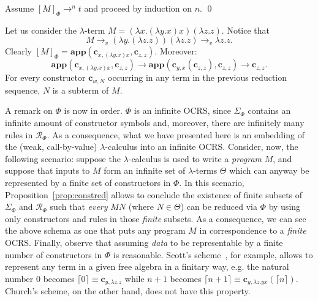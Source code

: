 \documentclass{LMCS}
\newcommand{\varone}{x}
\newcommand{\vartwo}{y}
\newcommand{\varthree}{z}
\newcommand{\varfour}{w}
\newcommand{\lambdaone}{M}
\newcommand{\lambdatwo}{N}
\newcommand{\termone}{t}
\newcommand{\nat}[1]{\lceil #1\rceil}
\newcommand{\appTRS}{\mathbf{app}}
\newcommand{\constr}[2]{\mathbf{c}_{#1,#2}}
\newcommand{\LambdatoTRS}[1]{[#1]_{\Phi}}
\newcommand{\Functions}[1]{\Sigma_{#1}}
\newcommand{\Rules}[1]{\mathcal{R}_{#1}}
\newcommand{\TRS}{\Phi}
\newcommand{\rewrTRS}{\rightarrow}
\newcommand{\rewrlambdav}{\rightarrow_v}
\newcounter{number}
\begin{document}
\proof
Assume $\LambdatoTRS{\lambdaone}\rewrTRS^n\termone$ and proceed
by induction on $n$.
\qed
\begin{exa}
Let us consider the $\lambda$-term $\lambdaone=(\lambda\varone.(\lambda \vartwo.\varone)\varone)
(\lambda\varthree.\varthree)$. Notice that 
$$
\lambdaone\rewrlambdav(\lambda \vartwo.(\lambda\varthree.\varthree))
(\lambda\varthree.\varthree)\rewrlambdav\lambda\varthree.\varthree.
$$
Clearly $\LambdatoTRS{\lambdaone}=\appTRS(\constr{\varone}{(\lambda\vartwo.\varone)\varone},
\constr{\varthree}{\varthree})$. Moreover:
$$
\appTRS(\constr{\varone}{(\lambda\vartwo.\varone)\varone},
\constr{\varthree}{\varthree})\rewrTRS \appTRS(\constr{\vartwo}{\varone}(\constr{\varthree}{\varthree}),
   \constr{\varthree}{\varthree})\rewrTRS\constr{\varthree}{\varthree}.
$$
For every constructor $\constr{\varfour}{\lambdatwo}$ occurring in any term in the previous
reduction sequence, $\lambdatwo$ is a subterm of $\lambdaone$. 
\end{exa}

A remark on $\TRS$ is now in order. $\TRS$ is an infinite OCRS, since $\Functions{\TRS}$ contains
an infinite amount of constructor symbols and, moreover, there are infinitely many
rules in $\Rules{\TRS}$. As a consequence, what we have presented here is an embedding
of the (weak, call-by-value) $\lambda$-calculus into an infinite OCRS. Consider, now,
the following scenario: suppose the $\lambda$-calculus is used to write a \emph{program} $\lambdaone$,
and suppose that inputs to $\lambdaone$ form an infinite set of $\lambda$-terms $\Theta$ which can 
anyway be represented by a finite set of constructors in $\TRS$. In this scenario,
Proposition~\ref{prop:constred} allows to conclude the existence of finite
subsets of $\Functions{\TRS}$ and $\Rules{\TRS}$ such that \emph{every} $\lambdaone\lambdatwo$
(where $\lambdatwo\in\Theta$) can be reduced via $\TRS$ by using only
constructors and rules in those \emph{finite} subsets. As a consequence, we can see the
above schema as one that puts any program $\lambdaone$ 
in correspondence to a \emph{finite} OCRS. Finally, observe that assuming \emph{data} to
be representable by a finite number of constructors in $\TRS$ is reasonable.
Scott's scheme~\cite{Wadsworth80}, for example, allows to represent any term in a given
free algebra in a finitary way, e.g. the natural number $0$ becomes
$\nat{0}\equiv\constr{\vartwo}{\lambda\varthree.\varthree}$ while
$n+1$ becomes $\nat{n+1}\equiv\constr{\vartwo}{\lambda\varthree.\vartwo\varone}(\nat{n})$.
Church's scheme, on the other hand, does not have this property.
\end{document}
